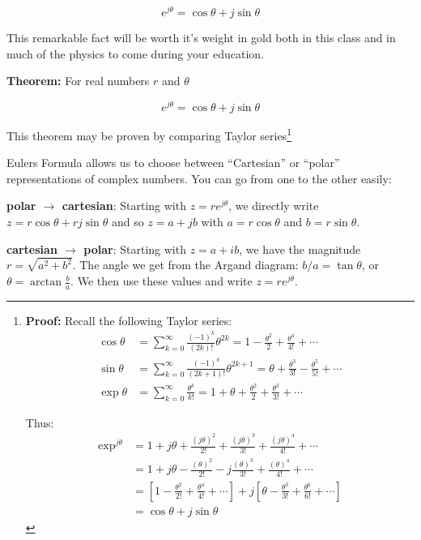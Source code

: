 \documentclass{tufte-book}
\begin{document}
\begin{equation}\label{eq:eulers}
e^{j\theta} = \cos\theta + j\sin\theta
\end{equation}

This remarkable fact will be worth it's weight in gold both in this class and in much of the physics to come during your education. 


\textbf{Theorem:} For real numbers $r$ and $\theta$

$$
e^{j\theta} = \cos\theta + j\sin\theta
$$

This theorem may be proven by comparing Taylor series\footnote
{
\textbf{Proof:} Recall the following Taylor series:
\begin{align*}
\cos\theta  &= \sum_{k=0}^\infty\frac{\left(-1\right)^k}{\left(2k\right)!}\theta^{2k} = 1 - \frac{\theta^2}{2} + \frac{\theta^4}{4!} + \cdots \\
\sin\theta  &= \sum_{k=0}^\infty\frac{\left(-1\right)^k}{\left(2k+1\right)!}\theta^{2k+1} = \theta + \frac{\theta^3}{3!} - \frac{\theta^5}{5!} + \cdots \\
\exp{\theta} &= \sum_{k=0}^\infty \frac{\theta^k}{k!} = 1 + \theta + \frac{\theta^2}{2} + \frac{\theta^3}{3!} + \cdots
\end{align*}

Thus:
\begin{align*}
\exp^{j\theta} &= 1 + j\theta + \frac{\left(j\theta\right)^2}{2!} +  \frac{\left(j\theta\right)^3}{3!} +  \frac{\left(j\theta\right)^4}{4!} + \cdots \\
&= 1 + j\theta - \frac{\left(\theta\right)^2}{2!} -  j\frac{\left(\theta\right)^3}{3!} + \frac{\left(\theta\right)^4}{4!} + \cdots \\
&= \left[1-\frac{\theta^2}{2!}+\frac{\theta^4}{4!} +\cdots\right] + j\left[\theta -\frac{\theta^3}{3!} + \frac{\theta^6}{6!} + \cdots\right] \\
&= \cos\theta + j\sin\theta 
\end{align*}
}

\noindent Eulers Formula allows us to choose between ``Cartesian'' or ``polar'' representations of complex numbers. You can go from one to the other easily:

\noindent\textbf{polar $\rightarrow$ cartesian}: Starting with $z = re^{j\theta}$, we directly write $z = r\cos\theta + rj\sin\theta$ and so $z = a + jb$ with $a = r\cos\theta$ and $b = r\sin\theta$.

\noindent\textbf{cartesian $\rightarrow$ polar}: Starting with $z = a+ib$, we have the magnitude $r = \sqrt{a^2+b^2}$. The angle we get from the Argand diagram: $b/a = \tan\theta$, or $\theta = \arctan\frac{b}{a}$. We then use these values and write $z = re^{j\theta}$.
\end{document}
